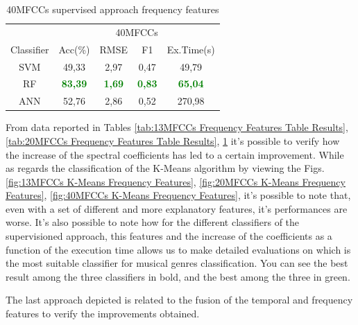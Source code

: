 \documentclass[conference]{IEEEtran}
\begin{document}
\begin{table}[!ht]
    \centering
    \caption{40MFCCs supervised approach frequency features}
    \label{tab:40MFCCs Frequency Features Table Results}
    \begin{tabular}{c c c c c}
    \toprule
    &\multicolumn{4}{c}{40MFCCs}\\
    \cmidrule{2-5}
        Classifier  &Acc(\%) &RMSE &F1 &Ex.Time(s)\\
    \midrule 
        SVM             &49,33 &2,97 &0,47  &49,79\\
        RF              &\textcolor{green}{\textbf{83,39}}&\textcolor{green}{\textbf{1,69}}
                        &\textcolor{green}{\textbf{0,83}}&\textcolor{green}{\textbf{65,04}}\\
        ANN             &52,76 &2,86 &0,52  &270,98\\
    \bottomrule
    \end{tabular}
\end{table}

\noindent
From data reported in Tables \ref{tab:13MFCCs Frequency Features Table Results}, \ref{tab:20MFCCs Frequency Features Table Results}, \ref{tab:40MFCCs Frequency Features Table Results} it's possible to verify how the increase of the spectral coefficients has led to a certain improvement. While as regards the classification of the K-Means algorithm by viewing the Figs. \ref{fig:13MFCCs K-Means Frequency Features}, \ref{fig:20MFCCs K-Means Frequency Features}, \ref{fig:40MFCCs K-Means Frequency Features}, it's possible to note that, even with a set of different and more explanatory features, it's performances are worse. It's also possible to note how for the different classifiers of the supervisioned approach, this features and the increase of the coefficients as a function of the execution time allows us to make detailed evaluations on which is the most suitable classifier for musical genres classification. You can see the best result among the three classifiers in bold, and the best among the three in green.

\newpage
\noindent
The last approach depicted is related to the fusion of the temporal and frequency features to verify the improvements obtained. 
\end{document}
